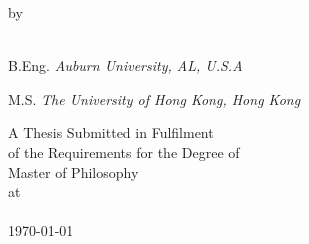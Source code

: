 \pagestyle{empty}
\newpage
\addtocounter{page}{-1}
\begin{center}
\vspace*{2cm}
\huge{ \bf \ttitle}
\end{center}

\vspace{20mm}
\begin{center}
by

\vspace{10mm}
{\bf \authorname}\\
B.Eng. \textit{Auburn University, AL, U.S.A} 

M.S. \textit{The University of Hong Kong, Hong Kong}
\end{center}

\vspace{30mm}
\begin{center}
A Thesis Submitted in Fulfilment \\
of the Requirements for the Degree of \\
Master of Philosophy \\
\vspace{10mm}
at \\
\vspace{10mm}
\univname\\
\monthyeardate\today
\end{center}